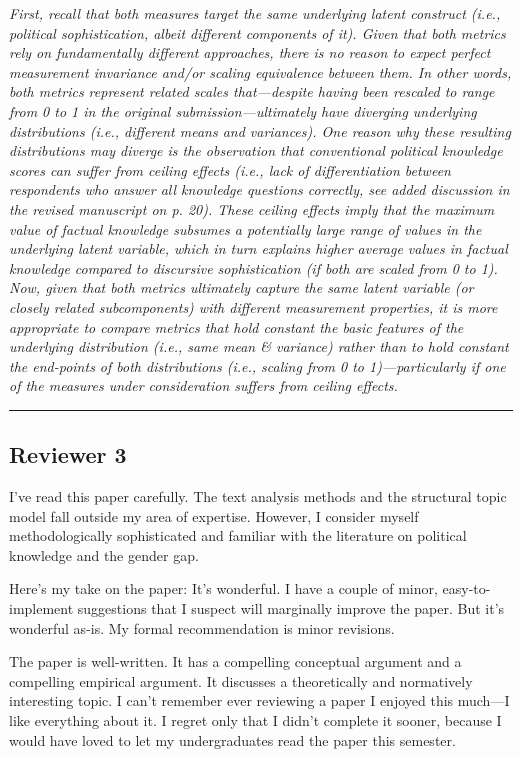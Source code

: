 \textit{First, recall that both measures target the same underlying latent construct (i.e., political sophistication, albeit different components of it). Given that both metrics rely on fundamentally different approaches, there is no reason to expect perfect measurement invariance and/or scaling equivalence between them. In other words, both metrics represent related scales that---despite having been rescaled to range from 0 to 1 in the original submission---ultimately have diverging underlying distributions (i.e., different means and variances). One reason why these resulting distributions may diverge is the observation that conventional political knowledge scores can suffer from ceiling effects (i.e., lack of differentiation between respondents who answer all knowledge questions correctly, see added discussion in the revised manuscript on p. 20). These ceiling effects imply that the maximum value of factual knowledge subsumes a potentially large range of values in the underlying latent variable, which in turn explains higher average values in factual knowledge compared to discursive sophistication (if both are scaled from 0 to 1). Now, given that both metrics ultimately capture the same latent variable (or closely related subcomponents) with different measurement properties, it is more appropriate to compare metrics that hold constant the basic features of the underlying distribution (i.e., same mean \& variance) rather than to hold constant the end-points of both distributions (i.e., scaling from 0 to 1)---particularly if one of the measures under consideration suffers from ceiling effects.}


\rule{\linewidth}{.01cm}


\subsection*{Reviewer 3}

I've read this paper carefully. The text analysis methods and the structural topic model fall outside my area of expertise. However, I consider myself methodologically sophisticated and familiar with the literature on political knowledge and the gender gap.

Here's my take on the paper: It’s wonderful. I have a couple of minor, easy-to-implement suggestions that I suspect will marginally improve the paper. But it’s wonderful as-is. My formal recommendation is minor revisions.

The paper is well-written. It has a compelling conceptual argument and a compelling empirical argument. It discusses a theoretically and normatively interesting topic. I can't remember ever reviewing a paper I enjoyed this much—I like everything about it. I regret only that I didn’t complete it sooner, because I would have loved to let my undergraduates read the paper this semester.

